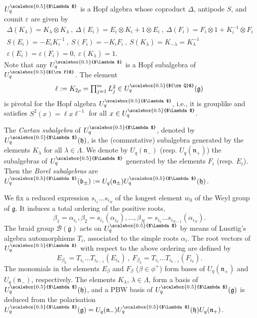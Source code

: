 \documentclass[11pt]{amsart}
\newcommand{\Q}{{\scalebox{0.5}{${\rm Q}$}}}
\newcommand{\Pup}{{\scalebox{0.5}{${\rm P}$}}}
\newcommand{\Lam}{{\scalebox{0.5}{$\Lambda$}}}
\begin{document}
$U_q^\Lam$ is a Hopf algebra whose coproduct $\Delta$, antipode $S$, and counit $\varepsilon$ are given by
\begin{equation*}\begin{array}{c}
\Delta(K_{\lambda})=K_{\lambda} \otimes K_{\lambda}\ ,\ \Delta(E_i)=E_i\otimes K_i+1\otimes E_i\ ,\ \Delta(F_i)=F_i\otimes 1 + K_i^{-1}\otimes F_i \\ S(E_i) = -E_iK_i^{-1}\ ,\ S(F_i) = -K_iF_i\ ,\ S(K_{\lambda}) = K_{-\lambda} = K_{\lambda}^{-1}\\ \varepsilon(E_i) = \varepsilon(F_i)=0,\ \varepsilon(K_{\lambda})=1.
\end{array}
\end{equation*}
Note that any $U_q^\Lam$ is a Hopf subalgebra of $U_q^\Pup$.
The element
$$\textstyle \ell := K_{2\rho} = \prod_{j=1}^mL_j^2\in U_q^\Q (\mathfrak{g})$$ 
is pivotal for the Hopf algebra $U_q^\Lam$, i.e., it is grouplike and satisfies $S^2(x) = \ell x\ell^{-1}$ for all $x\in U_q^\Lam$.

The {\em Cartan subalgebra} of $U_q^\Lam$, denoted by $U_q^\Lam(\mathfrak{h})$, is the (commutative) subalgebra generated by the elements $K_\lambda$ for all $\lambda \in \Lambda$. We denote by $U_q(\mathfrak{n}_-)$ (resp. $U_q(\mathfrak{n}_+)$) the subalgebras of $U_q^\Lam$ generated by the elements $F_i$ (resp. $E_i$). Then the {\em Borel subalgebras} are $U_q^\Lam(\mathfrak{b}_\pm) := U_q(\mathfrak{n}_\pm)U_q^\Lam(\mathfrak{h})$. 

We fix a reduced expression $s_{i_1}\ldots s_{i_N}$ of the longest element $w_0$ of the Weyl group of $\mathfrak{g}$. It induces a total ordering of the positive roots, 
\begin{equation}\label{orderingbeta}
\beta_1 = \alpha_{i_1}, \beta_2 = s_{i_1}(\alpha_{i_2}),\ldots, \beta_N = s_{i_1}\ldots s_{i_{N-1}}(\alpha_{i_N}).
\end{equation}
The braid group ${\mathcal B}(\mathfrak{g})$ acts on $U_q^\Lam$ by means of Lusztig's algebra automorphisms $T_i$, associated to the simple roots $\alpha_i$. The root vectors of $U_q^\Lam$ with respect to the above ordering are defined by
\begin{equation}\label{rootvectdef}
E_{\beta_k} =  T_{i_1}\ldots T_{i_{k-1}}(E_{i_k})\ ,\ F_{\beta_k} =  T_{i_1}\ldots T_{i_{k-1}}(F_{i_k}).
\end{equation}
The monomials in the elements $E_{\beta}$ and $F_{\beta}$ ($\beta\in \phi^+$) form bases of $U_q(\mathfrak{n}_+)$ and $U_q(\mathfrak{n}_-)$, respectively. The elements $K_{\lambda}$, $\lambda\in \Lambda$, form a basis of $U_q^\Lam(\mathfrak{h})$, and a PBW basis of $U_q^\Lam(\mathfrak{g})$ is deduced from the polarisation $U_q^\Lam(\mathfrak{g})=U_q(\mathfrak{n}_-)U_q^\Lam(\mathfrak{h})U_q(\mathfrak{n}_+)$. 
\end{document}
